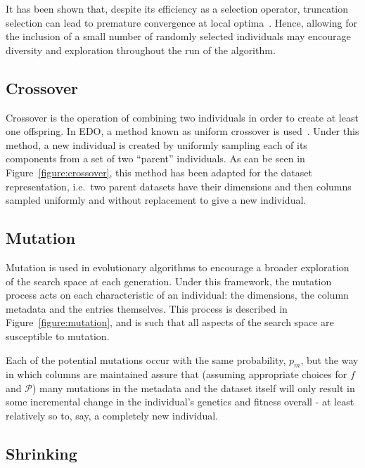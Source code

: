 It has been shown that, despite its efficiency as a selection operator,
truncation selection can lead to premature convergence at local
optima~\cite{Jebari2013, Tatsuya2002}. Hence, allowing for the inclusion of a
small number of randomly selected individuals may encourage diversity and
exploration throughout the run of the algorithm.

\subsection{Crossover}

Crossover is the operation of combining two individuals in order to create at
least one offspring. In EDO, a method known as uniform crossover is
used~\cite{Semenkin2012}. Under this method, a new individual is created by
uniformly sampling each of its
components from a set of two ``parent'' individuals. As can be seen in
Figure~\ref{figure:crossover}, this method has been adapted for the dataset
representation, i.e.\ two parent datasets have their dimensions and then columns
sampled uniformly and without replacement to give a new individual.



\subsection{Mutation}

Mutation is used in evolutionary algorithms to encourage a broader exploration
of the search space at each generation. Under this framework, the mutation
process acts on each characteristic of an individual: the dimensions, the column
metadata and the entries themselves. This process is described in
Figure~\ref{figure:mutation}, and is such that all aspects of the search space
are susceptible to mutation.


Each of the potential mutations occur with the same probability, \(p_m\), but
the way in which columns are maintained assure that (assuming appropriate
choices for \(f\) and \(\mathcal{P}\)) many mutations in the metadata and the
dataset itself will only result in some incremental change in the individual's
genetics and fitness overall \-- at least relatively so to, say, a completely
new individual.



\subsection{Shrinking}


